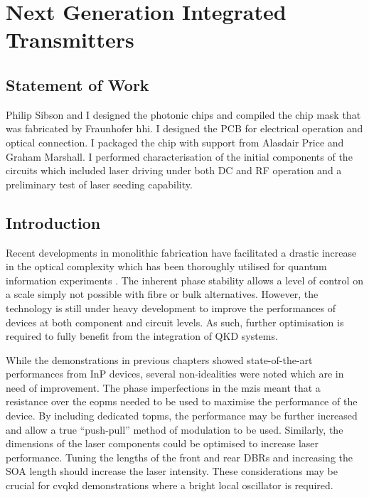 %
\graphicspath{{./chapters/chapter06/fig06/}}

\let\textcircled=\pgftextcircled
\chapter{Next Generation Integrated Transmitters}
\label{chap:future}

\section*{Statement of Work}

Philip Sibson and I designed the photonic chips and compiled the chip mask that was fabricated by Fraunhofer \ac{hhi}. I designed the PCB for electrical operation and optical connection. I packaged the chip with support from Alasdair Price and Graham Marshall. I performed characterisation of the initial components of the circuits which included laser driving under both DC and RF operation and a preliminary test of laser seeding capability.

\section{Introduction}

Recent developments in monolithic fabrication have facilitated a drastic increase in the optical complexity which has been thoroughly utilised for quantum information experiments \cite{wang2019integrated}. The inherent phase stability allows a level of control on a scale simply not possible with fibre or bulk alternatives. However, the technology is still under heavy development to improve the performances of devices at both component and circuit levels. As such, further optimisation is required to fully benefit from the integration of \ac{QKD} systems. 

While the demonstrations in previous chapters showed state-of-the-art performances from \ac{InP} devices, several non-idealities were noted which are in need of improvement. The phase imperfections in the \acp{mzi} meant that a resistance over the \acp{eopm} needed to be used to maximise the performance of the device. By including dedicated \acp{topm}, the performance may be further increased and allow a true ``push-pull'' method of modulation to be used. Similarly, the dimensions of the laser components could be optimised to increase laser performance. Tuning the lengths of the front and rear \acp{DBR} and increasing the \ac{SOA} length should increase the laser intensity. These considerations may be crucial for \ac{cvqkd} demonstrations where a bright local oscillator is required. 

